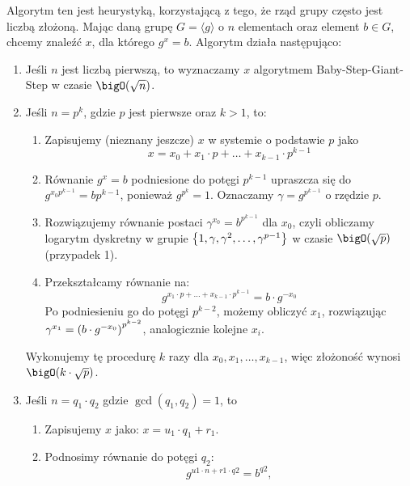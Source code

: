 Algorytm ten jest heurystyką, korzystającą z tego, że rząd grupy często jest liczbą złożoną. Mając daną grupę \( G = \langle g \rangle \) o \( n \) elementach oraz element \( b \in G \), chcemy znaleźć \( x \), dla którego \( g^x = b \). Algorytm działa następująco:
\begin{greyframe}
    \begin{enumerate}[I]
        \item Jeśli \( n \) jest liczbą pierwszą, to wyznaczamy \( x \) algorytmem Baby-Step-Giant-Step w czasie \( \bigO(\sqrt{n}) \).
        \item Jeśli \( n = p^k \), gdzie \( p \) jest pierwsze oraz \( k > 1 \), to:
            \begin{enumerate}
                \item Zapisujemy (nieznany jeszcze) \( x \) w systemie o podstawie \( p \) jako 
                \[
                    x = x_0 + x_1 \cdot p + \ldots + x_{k-1} \cdot p^{k-1}
                \]
                \item Równanie \( g^x = b \) podniesione do potęgi \( p^{k-1} \) upraszcza się do \( g^{x_0p^{k-1}} = b{p^{k-1}} \), ponieważ \( g^{p^k} = 1 \). Oznaczamy \( \gamma = g^{p^{k-1}} \) o rzędzie \( p \).
                \item Rozwiązujemy równanie postaci \( γ^{x_0} = b^{p^{k-1}} \) dla \( x_0 \), czyli obliczamy logarytm dyskretny w grupie \( \set{1, \gamma, \gamma^2, \ldots, \gamma^{p-1}} \) w czasie \( \bigO(\sqrt{p}) \) (przypadek 1).
                \item Przekształcamy równanie na: 
                \[
                    g^{x_1 \cdot p + \ldots + x_{k-1} \cdot p^{k-1}} = b \cdot g^{-x_0}
                \]
                Po podniesieniu go do potęgi \( p^{k-2} \), możemy obliczyć \( x_1 \), rozwiązując \( \gamma^{x_1} = \left(b \cdot g^{-x_0}\right)^{p^{k-2}} \), analogicznie kolejne \( x_i \).
            \end{enumerate}
        Wykonujemy tę procedurę \( k \) razy dla \( x_0, x_1, \ldots, x_{k-1} \), więc złożoność wynosi \( \bigO(k \cdot \sqrt{p}) \).
        \item Jeśli \( n  = q_1 \cdot q_2 \) gdzie \( \gcd(q_1, q_2) = 1 \), to
        \begin{enumerate}
            \item Zapisujemy \( x \) jako: \( x = u_1 \cdot q_1 + r_1 \).
            \item Podnosimy równanie do potęgi \( q_2\):
            \[
                g^{u1·n+r1·q2} = b^{q2},
\]
\end{enumerate}
\end{enumerate}
\end{greyframe}
